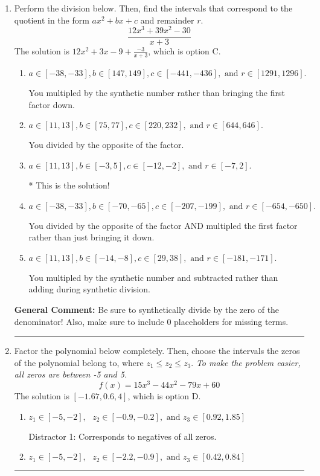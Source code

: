\documentclass{extbook}[14pt]
\newcommand{\litem}[1]{\item #1

\rule{\textwidth}{0.4pt}}
\begin{document}
\begin{enumerate}\litem{
Perform the division below. Then, find the intervals that correspond to the quotient in the form $ax^2+bx+c$ and remainder $r$.
\[ \frac{12x^{3} +39 x^{2} -30}{x + 3} \]The solution is \( 12x^{2} +3 x -9 + \frac{-3}{x + 3} \), which is option C.\begin{enumerate}[label=\Alph*.]
\item \( a \in [-38, -33], b \in [147, 149], c \in [-441, -436], \text{ and } r \in [1291, 1296]. \)

 You multipled by the synthetic number rather than bringing the first factor down.
\item \( a \in [11, 13], b \in [75, 77], c \in [220, 232], \text{ and } r \in [644, 646]. \)

 You divided by the opposite of the factor.
\item \( a \in [11, 13], b \in [-3, 5], c \in [-12, -2], \text{ and } r \in [-7, 2]. \)

* This is the solution!
\item \( a \in [-38, -33], b \in [-70, -65], c \in [-207, -199], \text{ and } r \in [-654, -650]. \)

 You divided by the opposite of the factor AND multipled the first factor rather than just bringing it down.
\item \( a \in [11, 13], b \in [-14, -8], c \in [29, 38], \text{ and } r \in [-181, -171]. \)

 You multipled by the synthetic number and subtracted rather than adding during synthetic division.
\end{enumerate}

\textbf{General Comment:} Be sure to synthetically divide by the zero of the denominator! Also, make sure to include 0 placeholders for missing terms.
}
\litem{
Factor the polynomial below completely. Then, choose the intervals the zeros of the polynomial belong to, where $z_1 \leq z_2 \leq z_3$. \textit{To make the problem easier, all zeros are between -5 and 5.}
\[ f(x) = 15x^{3} -44 x^{2} -79 x + 60 \]The solution is \( [-1.67, 0.6, 4] \), which is option D.\begin{enumerate}[label=\Alph*.]
\item \( z_1 \in [-5, -2], \text{   }  z_2 \in [-0.9, -0.2], \text{   and   } z_3 \in [0.92, 1.85] \)

 Distractor 1: Corresponds to negatives of all zeros.
\item \( z_1 \in [-5, -2], \text{   }  z_2 \in [-2.2, -0.9], \text{   and   } z_3 \in [0.42, 0.84] \)


\end{enumerate}}
\end{enumerate}
\end{document}
